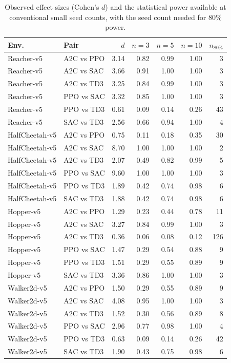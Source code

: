 \begin{table}[t]
\centering
\footnotesize
\caption{Observed effect sizes (Cohen's $d$) and the statistical power available at conventional small seed counts, with the seed count needed for 80\% power.}
\label{tab:power}
\begin{tabular}{llrrrrr}
\toprule
Env. & Pair & $d$ & $n{=}3$ & $n{=}5$ & $n{=}10$ & $n_{80\%}$ \\
\midrule
Reacher-v5 & A2C vs PPO & 3.14 & 0.82 & 0.99 & 1.00 & 3 \\
Reacher-v5 & A2C vs SAC & 3.66 & 0.91 & 1.00 & 1.00 & 3 \\
Reacher-v5 & A2C vs TD3 & 3.25 & 0.84 & 0.99 & 1.00 & 3 \\
Reacher-v5 & PPO vs SAC & 3.32 & 0.85 & 1.00 & 1.00 & 3 \\
Reacher-v5 & PPO vs TD3 & 0.61 & 0.09 & 0.14 & 0.26 & 43 \\
Reacher-v5 & SAC vs TD3 & 2.56 & 0.66 & 0.94 & 1.00 & 4 \\
HalfCheetah-v5 & A2C vs PPO & 0.75 & 0.11 & 0.18 & 0.35 & 30 \\
HalfCheetah-v5 & A2C vs SAC & 8.70 & 1.00 & 1.00 & 1.00 & 2 \\
HalfCheetah-v5 & A2C vs TD3 & 2.07 & 0.49 & 0.82 & 0.99 & 5 \\
HalfCheetah-v5 & PPO vs SAC & 9.60 & 1.00 & 1.00 & 1.00 & 3 \\
HalfCheetah-v5 & PPO vs TD3 & 1.89 & 0.42 & 0.74 & 0.98 & 6 \\
HalfCheetah-v5 & SAC vs TD3 & 1.88 & 0.42 & 0.74 & 0.98 & 6 \\
Hopper-v5 & A2C vs PPO & 1.29 & 0.23 & 0.44 & 0.78 & 11 \\
Hopper-v5 & A2C vs SAC & 3.27 & 0.84 & 0.99 & 1.00 & 3 \\
Hopper-v5 & A2C vs TD3 & 0.36 & 0.06 & 0.08 & 0.12 & 126 \\
Hopper-v5 & PPO vs SAC & 1.47 & 0.29 & 0.54 & 0.88 & 9 \\
Hopper-v5 & PPO vs TD3 & 1.51 & 0.29 & 0.55 & 0.89 & 9 \\
Hopper-v5 & SAC vs TD3 & 3.36 & 0.86 & 1.00 & 1.00 & 3 \\
Walker2d-v5 & A2C vs PPO & 1.50 & 0.29 & 0.55 & 0.89 & 9 \\
Walker2d-v5 & A2C vs SAC & 4.08 & 0.95 & 1.00 & 1.00 & 3 \\
Walker2d-v5 & A2C vs TD3 & 1.52 & 0.30 & 0.56 & 0.89 & 8 \\
Walker2d-v5 & PPO vs SAC & 2.96 & 0.77 & 0.98 & 1.00 & 4 \\
Walker2d-v5 & PPO vs TD3 & 0.63 & 0.09 & 0.14 & 0.26 & 42 \\
Walker2d-v5 & SAC vs TD3 & 1.90 & 0.43 & 0.75 & 0.98 & 6 \\
\bottomrule
\end{tabular}
\end{table}